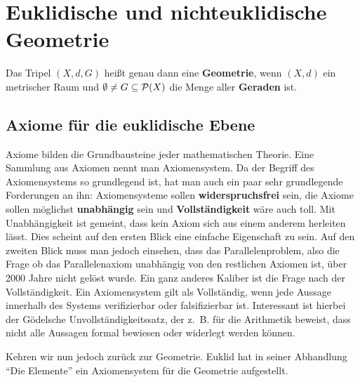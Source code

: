 \chapter{Euklidische und nichteuklidische Geometrie}

\begin{definition}
    Das Tripel $(X, d, G)$ heißt genau dann eine \textbf{Geometrie},
    wenn $(X, d)$ ein metrischer Raum und $\emptyset \neq G \subseteq \mathcal{P}(X)$
    die Menge aller \textbf{Geraden} ist.
\end{definition}

\section{Axiome für die euklidische Ebene}
Axiome bilden die Grundbausteine jeder mathematischen Theorie. Eine
Sammlung aus Axiomen nennt man Axiomensystem.
Da der Begriff des Axiomensystems so grundlegend ist, hat man auch 
ein paar sehr grundlegende Forderungen an ihn: Axiomensysteme sollen
\textbf{widerspruchsfrei} sein, die Axiome sollen möglichst
\textbf{unabhängig} sein und \textbf{Vollständigkeit} wäre auch toll.
Mit Unabhängigkeit ist gemeint, dass kein Axiom sich aus einem anderem
herleiten lässt. Dies scheint auf den ersten Blick eine einfache
Eigenschaft zu sein. Auf den zweiten Blick muss man jedoch einsehen, 
dass das Parallelenproblem, also die Frage ob das Parallelenaxiom 
unabhängig von den restlichen Axiomen ist, über 2000 Jahre nicht 
gelöst wurde. Ein ganz anderes Kaliber ist die Frage nach der
Vollständigkeit. Ein Axiomensystem gilt als Vollständig, wenn
jede Aussage innerhalb des Systems verifizierbar oder falsifizierbar
ist. Interessant ist hierbei der Gödelsche Unvollständigkeitssatz, 
der z.~B. für die Arithmetik beweist, dass nicht alle Aussagen
formal bewiesen oder widerlegt werden können.

Kehren wir nun jedoch zurück zur Geometrie. Euklid hat in seiner 
Abhandlung \enquote{Die Elemente} ein Axiomensystem für die Geometrie
aufgestellt. 


